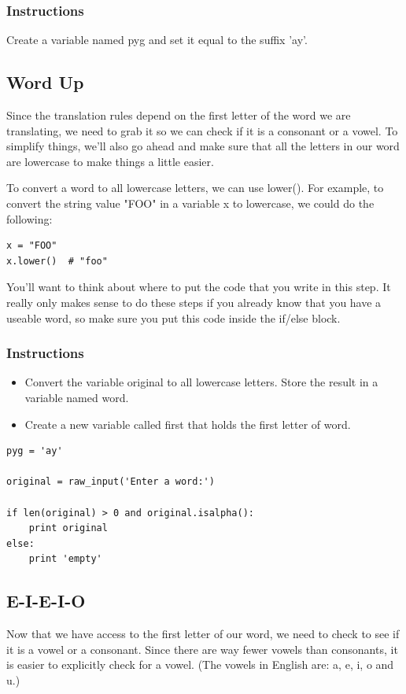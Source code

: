 \documentclass[12pt,a4paper,final,twoside,onecolumn,titlepage]{book}
\begin{document}
\subsubsection{Instructions}
Create a variable named pyg and set it equal to the suffix 'ay'.

\subsection{Word Up}

Since the translation rules depend on the first letter of the word we are translating, we need to grab it so we can check if it is a consonant or a vowel. To simplify things, we'll also go ahead and make sure that all the letters in our word are lowercase to make things a little easier.

To convert a word to all lowercase letters, we can use lower(). For example, to convert the string value "FOO" in a variable x to lowercase, we could do the following:
\begin{lstlisting}
x = "FOO"
x.lower()  # "foo"
\end{lstlisting}
You'll want to think about where to put the code that you write in this step. It really only makes sense to do these steps if you already know that you have a useable word, so make sure you put this code inside the if/else block.
\subsubsection{Instructions}
\begin{itemize}
\item Convert the variable original to all lowercase letters. Store the result in a variable named word.
\item    Create a new variable called first that holds the first letter of word.
\end{itemize}

\begin{lstlisting}
pyg = 'ay'

original = raw_input('Enter a word:')

if len(original) > 0 and original.isalpha():
    print original
else:
    print 'empty'
\end{lstlisting}

\subsection{E-I-E-I-O}

Now that we have access to the first letter of our word, we need to check to see if it is a vowel or a consonant. Since there are way fewer vowels than consonants, it is easier to explicitly check for a vowel. (The vowels in English are: a, e, i, o and u.)
\end{document}
